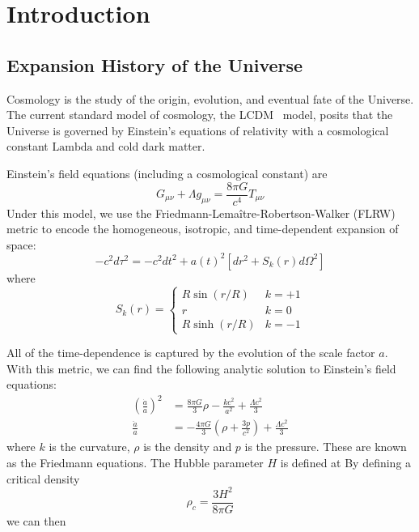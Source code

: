 \chapter{Introduction}

\section{Expansion History of the Universe}
Cosmology is the study of the origin, evolution, and eventual fate of the Universe. The current standard model of cosmology, the LCDM \ model, posits that the Universe is governed by Einstein's equations of relativity with a cosmological constant $\textrm{Lambda}$ and cold dark matter. 

Einstein's field equations (including a cosmological constant) are
\begin{equation}
    G_{\mu\nu} + \Lambda g_{\mu\nu} = \frac{8\pi G}{c^4}T_{\mu\nu}
    \label{eq:einstein_field}
\end{equation}
Under this model, we use the Friedmann-Lema\^{i}tre-Robertson-Walker (FLRW) metric to encode the homogeneous, isotropic, and time-dependent expansion of space:
\begin{equation}
    -c^2 d\tau^2 = -c^2dt^2 + a(t)^2\left[dr^2 + S_k(r)d\Omega^2\right]
    \label{eq:flrw_metric}
\end{equation}
where
\begin{equation}
    S_k(r) =
    \begin{cases}
    R\sin(r/R) & k=+1\\
    r & k=0\\
    R\sinh(r/R) & k=-1
    \end{cases}
    \label{eq:curvature}
\end{equation}

All of the time-dependence is captured by the evolution of the scale factor $a$. With this metric, we can find the following analytic solution to Einstein's field equations:
\begin{align}
    \left(\frac{\dot{a}}{a}\right)^2 & = \frac{8\pi G}{3} \rho - \frac{kc^2}{a^2} + \frac{\Lambda c^2}{3}\\
    \frac{\ddot{a}}{a} & = -\frac{4\pi G}{3}\left(\rho + \frac{3p}{c^2}\right) + \frac{\Lambda c^2}{3}
    \label{eqn:friedmann_eqns}
\end{align}
where $k$ is the curvature, $\rho$ is the density and $p$ is the pressure. These are known as the Friedmann equations. The Hubble parameter $H$ is defined at By defining a critical density
\begin{equation}
    \rho_c = \frac{3H^2}{8\pi G}
\end{equation}
we can then 

